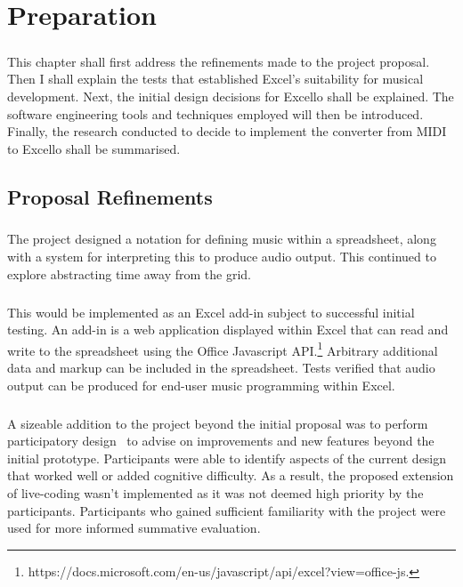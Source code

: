
\chapter{Preparation}

\paragraph{} This chapter shall first address the refinements made to the project proposal. Then I shall explain the tests that established Excel's suitability for musical development. Next, the initial design decisions for Excello shall be explained. The software engineering tools and techniques employed will then be introduced. Finally, the research conducted to decide to implement the converter from MIDI to Excello shall be summarised.

\section{Proposal Refinements}

\paragraph{} The project designed a notation for defining music within a spreadsheet, along with a system for interpreting this to produce audio output. This continued to explore abstracting time away from the grid.

\paragraph{} This would be implemented as an Excel add-in subject to successful initial testing. An add-in is a web application displayed within Excel that can read and write to the spreadsheet using the Office Javascript API.\footnote{https://docs.microsoft.com/en-us/javascript/api/excel?view=office-js.} Arbitrary additional data and markup can be included in the spreadsheet. Tests verified that audio output can be produced for end-user music programming within Excel.

\paragraph{} A sizeable addition to the project beyond the initial proposal was to perform participatory design~\cite{muller:pd} to advise on improvements and new features beyond the initial prototype. Participants were able to identify aspects of the current design that worked well or added cognitive difficulty. As a result, the proposed extension of live-coding wasn't implemented as it was not deemed high priority by the participants. Participants who gained sufficient familiarity with the project were used for more informed summative evaluation.

